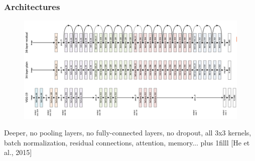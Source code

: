 \documentclass{beamer}
\newcommand{\source}[1]{\vskip0pt plus 1filll \scriptsize #1}
\begin{document}
	\begin{frame}
		\frametitle{Architectures}
		\begin{figure}[h]
			\centering
			\includegraphics[width=\textwidth]{plots/resNet.png}
		\end{figure}
		
		Deeper, no pooling layers, no fully-connected layers, no dropout, all 3x3 kernels, batch normalization, residual connections, attention, memory...
		\source{[He et al., 2015]}
	\end{frame}
\end{document}
